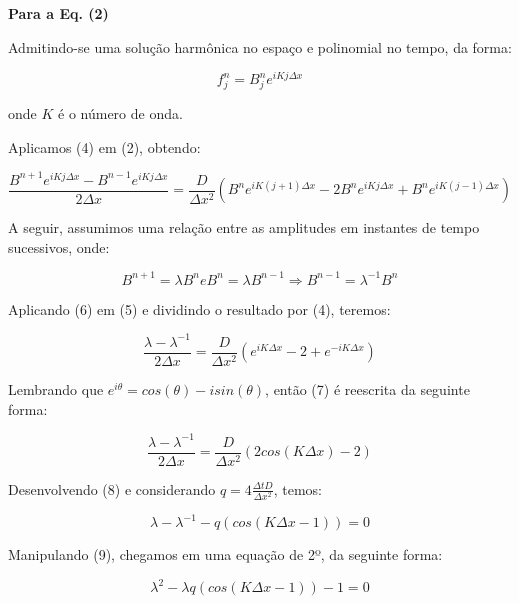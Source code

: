 \documentclass[11pt]{article}
\begin{document}
\textbf{Para a Eq. (2)}

Admitindo-se uma solução harmônica no espaço e polinomial no tempo, da
forma:

\begin{equation}
    f^{n}_{j} = B^{n}_{j}e^{iKj\Delta{x}}
\end{equation}

onde \(K\) é o número de onda.

Aplicamos (4) em (2), obtendo:

\begin{equation}
    \frac{B^{n+1}e^{iKj\Delta{x}} - B^{n-1}e^{iKj\Delta{x}} }{2\Delta{x}} = \frac{D}{\Delta{x^2}}(B^{n}e^{iK(j+1)\Delta{x}} - 2B^{n}e^{iKj\Delta{x}} + B^{n}e^{iK(j-1)\Delta{x}})
\end{equation}

A seguir, assumimos uma relação entre as amplitudes em instantes de
tempo sucessivos, onde:

\begin{equation}
    B^{n+1} = \lambda B^{n} e B^{n} = \lambda B^{n-1} \Rightarrow B^{n-1} = \lambda^{-1}B^n
\end{equation}

Aplicando (6) em (5) e dividindo o resultado por (4), teremos:

\begin{equation}
    \frac{\lambda - \lambda^{-1}}{2\Delta{x}} = \frac{D}{\Delta{x^2}}(e^{iK\Delta{x}} - 2 + e^{-iK\Delta{x}})
\end{equation}

Lembrando que \(e^{i\theta} = cos(\theta) - isin(\theta)\), então (7) é
reescrita da seguinte forma:

\begin{equation}
    \frac{\lambda - \lambda^{-1}}{2\Delta{x}} = \frac{D}{\Delta{x^2}}(2cos(K\Delta{x}) - 2)
\end{equation}

Desenvolvendo (8) e considerando
\(q = 4\frac{\Delta{t}D}{\Delta{x^2}}\), temos:

\begin{equation}
    \lambda - \lambda^{-1} - q(cos(K\Delta{x} -1)) = 0
\end{equation}

Manipulando (9), chegamos em uma equação de 2º, da seguinte forma:

\begin{equation}
    \lambda^{2} - \lambda q(cos(K\Delta{x} -1)) -1 = 0
\end{equation}
\end{document}
